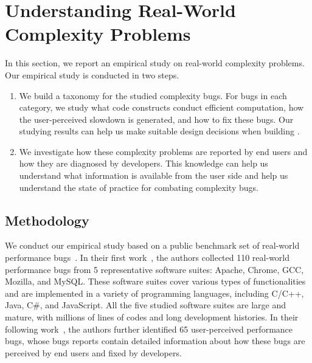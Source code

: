 \section{Understanding Real-World Complexity Problems}
\label{sec:study}

In this section, we report an empirical study on real-world 
complexity problems. Our empirical study is conducted in two steps.

\begin{enumerate}

\item We build a taxonomy for the studied complexity bugs. 
For bugs in each category, 
we study what code constructs conduct efficient computation,
how the user-perceived slowdown is generated, 
and how to fix these bugs. 
Our studying results can help us 
make suitable design decisions when building \Tool. 

\item We investigate how these complexity problems are reported by end users
and how they are diagnosed by developers. 
This knowledge can help us understand what information is available from the user side
and help us understand the 
state of practice for combating complexity bugs.



\end{enumerate}

\subsection{Methodology}
\label{sec:meth}

%

We conduct our empirical study based on a public benchmark set of 
real-world performance bugs~\cite{PerfBug,SongOOPSLA2014}. 
In their first work~\cite{PerfBug}, 
the authors collected 110 real-world performance bugs from 5 representative 
software suites: Apache, Chrome, GCC, Mozilla, and MySQL. 
These software suites cover various types of functionalities and are implemented 
in a variety of programming languages, including C/C++, Java, C\#, and JavaScript. 
All the five studied software suites are large and mature, 
with millions of lines of codes and long development histories. 
In their following work~\cite{SongOOPSLA2014}, 
the authors further identified 65 user-perceived performance bugs, 
whose bugs reports contain detailed information 
about how these bugs are perceived by end users and fixed by developers.  

